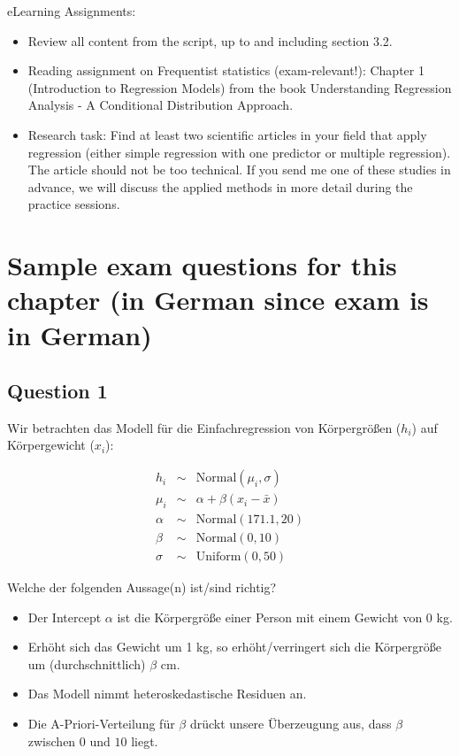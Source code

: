 \documentclass[
]{book}
\providecommand{\tightlist}{%
  \setlength{\itemsep}{0pt}\setlength{\parskip}{0pt}}
\begin{document}
eLearning Assignments:

\begin{itemize}
\tightlist
\item
  Review all content from the script, up to and including section 3.2.
\item
  Reading assignment on Frequentist statistics (exam-relevant!):
  Chapter 1 (Introduction to Regression Models) from the book
  Understanding Regression Analysis - A Conditional Distribution Approach.
\item
  Research task: Find at least two scientific articles in your field that apply
  regression (either simple regression with one predictor or multiple regression).
  The article should not be too technical.
  If you send me one of these studies in advance, we will discuss the
  applied methods in more detail during the practice sessions.
\end{itemize}

\section{Sample exam questions for this chapter (in German since exam is in German)}\label{sample-exam-questions-for-this-chapter-in-german-since-exam-is-in-german-1}

\subsection{Question 1}\label{question-1-1}

Wir betrachten das Modell für die Einfachregression von Körpergrößen (\(h_i\)) auf Körpergewicht (\(x_i\)):

\begin{eqnarray*}
h_i &\sim& \text{Normal}(\mu_i, \sigma)\\
\mu_i &\sim& \alpha + \beta (x_i - \bar{x})\\
\alpha &\sim& \text{Normal}(171.1, 20)\\
\beta &\sim& \text{Normal}(0, 10)\\
\sigma &\sim& \text{Uniform}(0, 50)
\end{eqnarray*}

Welche der folgenden Aussage(n) ist/sind richtig?

\begin{itemize}
\tightlist
\item
  Der Intercept \(\alpha\) ist die Körpergröße einer Person mit einem Gewicht von 0 kg.
\item
  Erhöht sich das Gewicht um 1 kg, so erhöht/verringert sich die Körpergröße um (durchschnittlich) \(\beta\) cm.
\item
  Das Modell nimmt heteroskedastische Residuen an.
\item
  Die A-Priori-Verteilung für \(\beta\) drückt unsere Überzeugung aus, dass \(\beta\) zwischen
  \(0\) und \(10\) liegt.
\end{itemize}
\end{document}

